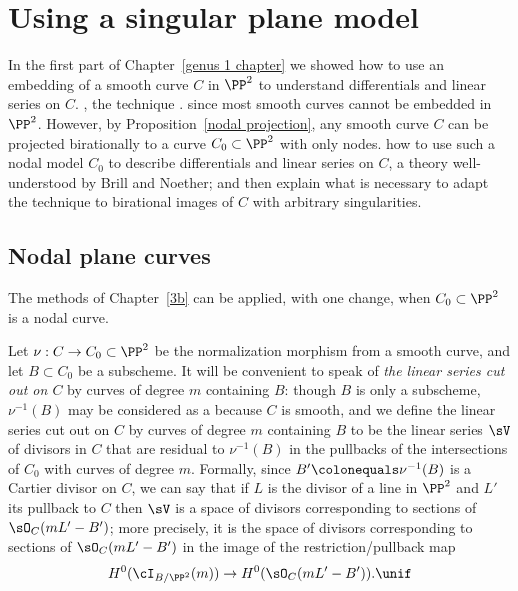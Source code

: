 

\def\adj{{\mathfrak F}}
\chapter{Using a singular plane model}
\label{PlaneCurvesChapter}
\label{PlaneCurveChapter}


In the first part of Chapter~\ref{genus 1 chapter} we showed how to
use an embedding of a smooth curve $C$ 
in $\PP^2$ to understand differentials and linear series on $C$. 
,
the technique 
. 
since most smooth curves cannot be embedded in
$\PP^2$.
However, by Proposition~\ref{nodal projection},
 any smooth curve $C$ can be projected 
birationally to a curve $C_0\subset\PP^2$ with only nodes. 
how to use such a nodal model $C_0$ to describe differentials and
linear series on $C$, a theory well-understood 
by Brill and Noether;  and then explain
what is necessary to adapt the technique to birational images of $C$
with arbitrary singularities. 

\section{Nodal plane curves}\label{nodal curves section}

The methods of Chapter~\ref{3b}
 can be applied, with one change, when $C_{0}\subset \PP^{2}$
%
is a nodal curve. 

Let $\nu: C\to C_{0}\subset \PP^{2}$ be the 
%
normalization morphism from a smooth curve,
and let $B\subset C_{0}$ be a subscheme.
It will be convenient to speak of 
%
\emph{the linear series cut out on $C$} by curves of degree $m$
containing $B$: though $B$ is only a subscheme, $\nu^{-1}(B)$ may be
considered as a 
%
 because
$C$ is smooth, and we define
the linear series cut out on $C$ by curves of degree $m$
containing $B$ to be
the linear series  $\sV$ of divisors in $C$ that are residual to $\nu^{-1}(B)$ in the pullbacks 
of the intersections of $C_{0}$ with curves of degree $m$. 
Formally, since $B' \colonequals  \nu^{-1}(B)$
is a Cartier divisor on $C$, we can say that if $L$ is the divisor of a line in $\PP^{2}$ and $L'$
its pullback to $C$ then
$\sV$ is a space of divisors corresponding to
sections of $\sO_{C}(mL'-B')$; more precisely, it is the space of divisors corresponding to
sections of $\sO_{C}(mL'-B')$ in the image of the restriction/pullback map
$$
H^0(\cI_{B/\PP^2}(m)) \to H^0(\sO_{C}(mL'-B')).
\unif
$$

